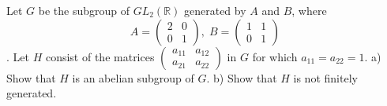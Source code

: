 Let $G$ be the subgroup of $GL_{2}(\mathbb{R})$ generated by $A$ and $B$, where
$$A=\begin{pmatrix}
2 &0\\
0&1
\end{pmatrix},\;
B=\begin{pmatrix}
1 &1\\
0&1
\end{pmatrix}$$.
Let $H$ consist of the matrices $\begin{pmatrix}
a_{11} &a_{12}\\
a_{21}& a_{22}
\end{pmatrix}$ in $G$ for which $a_{11}=a_{22}=1$.
a) Show that $H$ is an abelian subgroup of $G$.
b) Show that $H$ is not finitely generated.